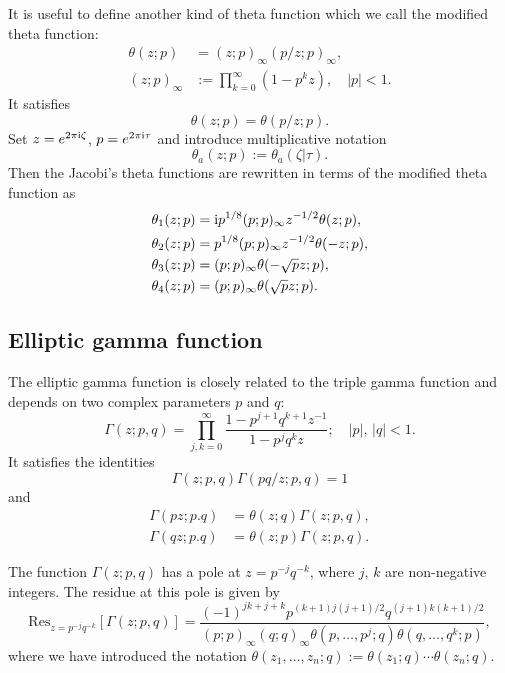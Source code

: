 It is useful to define another kind of theta function which we call the modified theta function:
\begin{align}
    \theta(z;p) &= (z;p)_{\infty} (p/z;p)_{\infty}, \\
    (z;p)_{\infty} &:= \prod_{k=0}^{\infty} (1-p^k z), \quad |p|<1.
\end{align}
It satisfies\begin{equation}
    \theta(z;p) = \theta(p/z;p).
\end{equation}
Set $z=e^{2\pi\mathrm{i}\zeta}$, $p=e^{2\pi\mathrm{i}\tau}$ and introduce multiplicative notation
\begin{equation}
    \theta_a(z;p) := \theta_a(\zeta|\tau).
\end{equation}
Then the Jacobi's theta functions are rewritten in terms of the modified theta function as
\begin{align}
    \theta_1(z;p) &= \mathrm{i} p^{1/8} (p;p)_{\infty} z^{-1/2} \theta(z;p), \\
    \theta_2(z;p) &= p^{1/8} (p;p)_{\infty} z^{-1/2} \theta(-z;p), \\
    \theta_3(z;p) &= (p;p)_{\infty} \theta(-\sqrt{p}z;p), \\
    \theta_4(z;p) &= (p;p)_{\infty} \theta(\sqrt{p}z;p).
\end{align}





\subsection{Elliptic gamma function}

The elliptic gamma function is closely related to the triple gamma function
and depends on two complex parameters $p$ and $q$:
\begin{equation}
    \Gamma(z;p,q) =
        \prod_{j,k=0}^{\infty} \frac{1-p^{j+1}q^{k+1}z^{-1}}{1-p^j q^k z};
    \quad
        |p|,\,|q| < 1.
\end{equation}
It satisfies the identities
\begin{equation}
    \Gamma(z;p,q) \Gamma(pq/z;p,q) = 1
\end{equation}
and
\begin{align}
    \Gamma(pz;p.q) &= \theta(z;q) \Gamma(z;p,q), \\
    \Gamma(qz;p.q) &= \theta(z;p) \Gamma(z;p,q).
\end{align}

The function $\Gamma(z;p,q)$ has a pole at $z=p^{-j}q^{-k}$, where $j,\,k$ are non-negative integers.
The residue at this pole is given by
\begin{equation}
    \mathrm{Res}_{z=p^{-j}q^{-k}} \left[ \Gamma(z;p,q) \right]
    = \frac{(-1)^{jk+j+k}p^{(k+1)j(j+1)/2}q^{(j+1)k(k+1)/2}}
    {(p;p)_{\infty} (q;q)_{\infty} \theta(p,\ldots,p^j;q)\theta(q,\ldots,q^k;p)},
\label{eq:gamma_residue}
\end{equation}
where we have introduced the notation $\theta(z_1,\ldots,z_n;q):=\theta(z_1;q)\cdots\theta(z_n;q)$.

